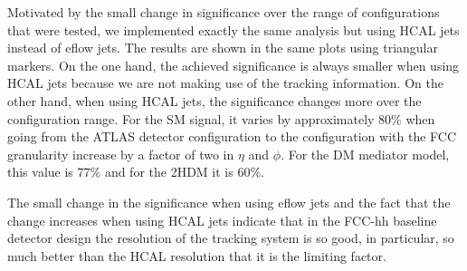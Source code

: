 Motivated by the small change in significance over the range of configurations that were tested, we implemented exactly the same analysis but using HCAL jets instead of eflow jets. The results are shown in the same plots using triangular markers. On the one hand, the achieved significance is always smaller when using HCAL jets because we are not making use of the tracking information. On the other hand, when using HCAL jets, the significance changes more over the configuration range. For the SM signal, it varies by approximately $80\%$ when going from the ATLAS detector configuration to the configuration with the FCC granularity increase by a factor of two in $\eta$ and $\phi$. For the DM mediator model, this value is $77\%$ and for the 2HDM it is $60\%$.

The small change in the significance when using eflow jets and the fact that the change increases when using HCAL jets indicate that in the FCC-hh baseline detector design the resolution of the tracking system is so good, in particular, so much better than the HCAL resolution that it is the limiting factor.


